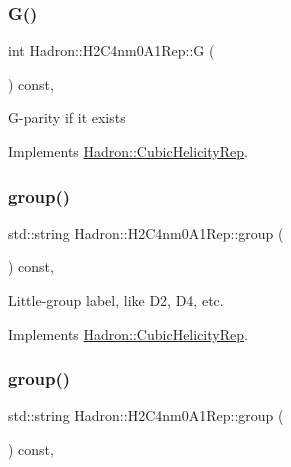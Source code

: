\subsubsection{\texorpdfstring{G()}{G()}\hspace{0.1cm}{\footnotesize\ttfamily [3/3]}}
{\footnotesize\ttfamily int Hadron\+::\+H2\+C4nm0\+A1\+Rep\+::G (\begin{DoxyParamCaption}{ }\end{DoxyParamCaption}) const\hspace{0.3cm}{\ttfamily [inline]}, {\ttfamily [virtual]}}

G-\/parity if it exists 

Implements \mbox{\hyperlink{structHadron_1_1CubicHelicityRep_a50689f42be1e6170aa8cf6ad0597018b}{Hadron\+::\+Cubic\+Helicity\+Rep}}.

\mbox{\label{structHadron_1_1H2C4nm0A1Rep_ae21ccc52d2b7461dd5dddbfa46b8f878}} 
\subsubsection{\texorpdfstring{group()}{group()}\hspace{0.1cm}{\footnotesize\ttfamily [1/5]}}
{\footnotesize\ttfamily std\+::string Hadron\+::\+H2\+C4nm0\+A1\+Rep\+::group (\begin{DoxyParamCaption}{ }\end{DoxyParamCaption}) const\hspace{0.3cm}{\ttfamily [inline]}, {\ttfamily [virtual]}}

Little-\/group label, like D2, D4, etc. 

Implements \mbox{\hyperlink{structHadron_1_1CubicHelicityRep_a101a7d76cd8ccdad0f272db44b766113}{Hadron\+::\+Cubic\+Helicity\+Rep}}.

\mbox{\label{structHadron_1_1H2C4nm0A1Rep_ae21ccc52d2b7461dd5dddbfa46b8f878}} 
\subsubsection{\texorpdfstring{group()}{group()}\hspace{0.1cm}{\footnotesize\ttfamily [2/5]}}
{\footnotesize\ttfamily std\+::string Hadron\+::\+H2\+C4nm0\+A1\+Rep\+::group (\begin{DoxyParamCaption}{ }\end{DoxyParamCaption}) const\hspace{0.3cm}{\ttfamily [inline]}, {\ttfamily [virtual]}}

